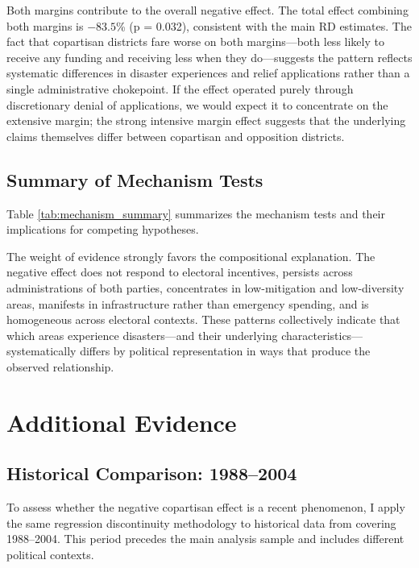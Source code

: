 \documentclass[12pt,letterpaper,oneside]{book}
\newcommand{\basepath}{g:/My Drive/Grad School}
\newcommand{\basepath}{basepath}
\begin{document}
Both margins contribute to the overall negative effect. The total effect combining both margins is $-83.5$\% (p = 0.032), consistent with the main RD estimates. The fact that copartisan districts fare worse on both margins---both less likely to receive any funding and receiving less when they do---suggests the pattern reflects systematic differences in disaster experiences and relief applications rather than a single administrative chokepoint. If the effect operated purely through discretionary denial of applications, we would expect it to concentrate on the extensive margin; the strong intensive margin effect suggests that the underlying claims themselves differ between copartisan and opposition districts.

\subsection{Summary of Mechanism Tests}

Table \ref{tab:mechanism_summary} summarizes the mechanism tests and their implications for competing hypotheses.



The weight of evidence strongly favors the compositional explanation. The negative effect does not respond to electoral incentives, persists across administrations of both parties, concentrates in low-mitigation and low-diversity areas, manifests in infrastructure rather than emergency spending, and is homogeneous across electoral contexts. These patterns collectively indicate that which areas experience disasters---and their underlying characteristics---systematically differs by political representation in ways that produce the observed relationship.

\section{Additional Evidence}\label{sec:additional}

\subsection{Historical Comparison: 1988--2004}

To assess whether the negative copartisan effect is a recent phenomenon, I apply the same regression discontinuity methodology to historical data from \cite{healy2009myopic} covering 1988--2004. This period precedes the main analysis sample and includes different political contexts.
\end{document}

